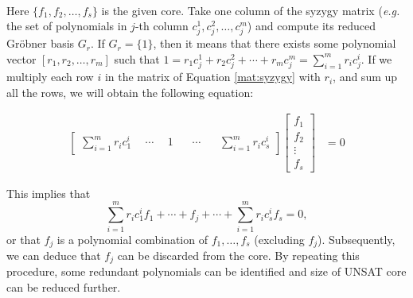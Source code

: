 \ \\
 Here $\{f_1,f_2,\dots,f_s\}$ is the given core.
 Take one column of the syzygy matrix ({\it e.g.} the set of polynomials in $j$-th column
 $c_j^1, c_j^2, \dots, c_j^m$)  and compute its reduced Gr\"obner
 basis $G_r$. If $G_r = \{1\}$, then it means that there exists some
 polynomial vector  $[r_1,r_2,\dots,r_m]$ such that $1 = r_1c_j^1 +
 r_2c_j^2 + \cdots + r_mc_j^m = \sum_{i=1}^m r_ic_j^i.$ 
 If we multiply each row $i$ in the matrix of Equation \ref{mat:syzygy}
 with $r_i$, and sum up all the rows, we will obtain the
 following equation: 
\vspace{-0.2in}
 \begin{center}
\begin{align}
   \begin{bmatrix}
           \sum_{i=1}^m r_ic_1^i & ~~\cdots & ~~ 1 ~~ & ~~ \cdots ~~ & ~~\sum_{i=1}^m r_ic_s^i
         \end{bmatrix}
    \begin{bmatrix}
           f_{1} \\
           f_{2} \\
           \vdots \\
           f_{s}
         \end{bmatrix}
         &= 0
  \end{align}

\end{center}

This implies that 
 $$\sum_{i=1}^m r_ic_1^if_1 + \cdots + f_j
 +\cdots + \sum_{i=1}^m r_ic_s^if_s = 0,$$
or that $f_j$ is a polynomial combination of
$f_1,\dots,f_s$ (excluding $f_j$). Subsequently, we can deduce that $f_j$ can be
discarded from the core. By repeating this procedure, some redundant
polynomials can be identified and size of UNSAT core can be reduced
further. 


